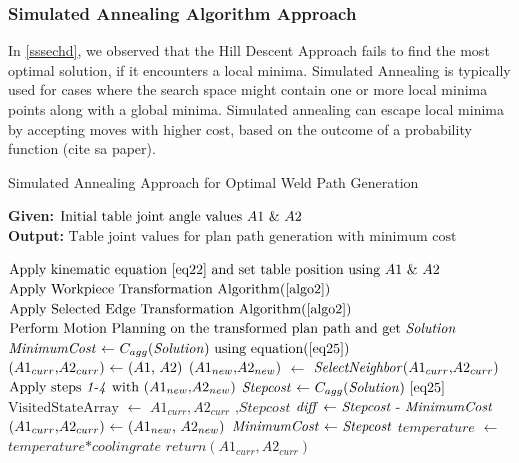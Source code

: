 \subsubsection{Simulated Annealing Algorithm Approach}
In \ref{sssechd}, we observed that the Hill Descent Approach fails to find the most optimal solution, if it encounters a local minima. Simulated Annealing is typically used for cases where the search space might contain one or more local minima points along with a global minima. Simulated annealing can escape local minima by accepting moves with higher cost, based on the outcome of a probability function (cite sa paper). 
\begin{algorithm}[!ht]
	\caption{Simulated Annealing Approach for Optimal Weld Path Generation}
	\label{algo5}
	\textbf{Given:} $ \text{Initial table joint angle values \textit{$A1$} \& \textit{$A2$}}$ \\ 
	\textbf{Output:} $ \text{Table joint values for plan path generation with minimum cost}$
	
	\begin{algorithmic}[1]
		\State $\text{Apply kinematic equation \ref{eq22} and set table position using \textit{$A1$} \& \textit{$A2$}}$
		\State $\text{Apply Workpiece Transformation Algorithm(\ref{algo2})}$
		\State $\text{Apply Selected Edge Transformation Algorithm(\ref{algo2})}$
		\State $\text{Perform Motion Planning on the transformed plan path and get \textit{Solution}}$
		\State $\text{\textit{MinimumCost} $\gets$ $C_{agg}$(\textit{Solution}) using equation(\ref{eq25})}$
		\State $\text{(\textit{$A1_{curr}$},\textit{$A2_{curr}$}) $\gets$ (\textit{$A1$}, \textit{$A2$})}$
		\State $\text{(\textit{$A1_{new}$},\textit{$A2_{new}$})}$ $\gets$ $\text{\textit{SelectNeighbor}(\textit{$A1_{curr}$},\textit{$A2_{curr}$})}$
		\State $\text{Apply steps \textit{1-4} with (\textit{$A1_{new}$},\textit{$A2_{new}$})}$
		\State $\text{\textit{Stepcost} $\gets$ $C_{agg}$(\textit{Solution}) \ref{eq25}}$
		\State $\text{VisitedStateArray}$ $\gets$ $\textit{$A1_{curr}$},\textit{$A2_{curr}$}$ $\textit{,Stepcost}$ 
		\State $\text{\textit{diff} $\gets$ \textit{Stepcost} - \textit{MinimumCost}}$
		\State $\text{(\textit{$A1_{curr}$},\textit{$A2_{curr}$}) $\gets$ (\textit{$A1_{new}$}, \textit{$A2_{new}$})}$
		\State $\text{\textit{MinimumCost} $\gets$ \textit{Stepcost}}$
		\EndIf
		\State $\textit{temperature}$ $\gets$ $\textit{temperature*coolingrate}$
		\EndWhile %
		\State $\textit{return} (\textit{$A1_{curr}$},\textit{$A2_{curr}$})$      
	\end{algorithmic}
\end{algorithm}\\
